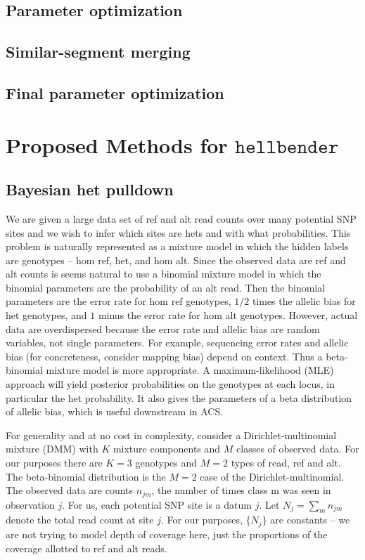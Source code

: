 \documentclass[nofootinbib,amssymb,amsmath]{revtex4}
\begin{document}
\subsection{Parameter optimization}\label{parameter-optimization}

\subsection{Similar-segment merging} \label{similar-segment-merging}

\subsection{Final parameter optimization} \label{final-parameter-optimization}

\section{Proposed Methods for $\texttt{hellbender}$} \label{proposed-methods-for-texttthellbender}

\subsection{Bayesian het pulldown} \label{bayesian-het-pulldown}

We are given a large data set of ref and alt read counts over many potential SNP sites and we wish to infer which sites are hets and with what probabilities.  This problem is naturally represented as a mixture model in which the hidden labels are genotypes -- hom ref, het, and hom alt.  Since the observed data are ref and alt counts is seems natural to use a binomial mixture model in which the binomial parameters are the probability of an alt read.  Then the binomial parameters are the error rate for hom ref genotypes, $1/2$ times the allelic bias for het genotypes, and $1$ minus the error rate for hom alt genotypes.  However, actual data are overdispersed because the error rate and allelic bias are random variables, not single parameters.  For example, sequencing error rates and allelic bias (for concreteness, consider mapping bias) depend on context.  Thus a beta-binomial mixture model is more appropriate.  A maximum-likelihood (MLE) approach will yield posterior probabilities on the genotypes at each locus, in particular the het probability.  It also gives the parameters of a beta distribution of allelic bias, which is useful downstream in ACS.

For generality and at no cost in complexity, consider a Dirichlet-multinomial mixture (DMM) with $K$ mixture components and $M$ classes of observed data.  For our purposes there are $K = 3$ genotypes and $M = 2$ types of read, ref and alt.  The beta-binomial distribution is the $M = 2$ case of the Dirichlet-multinomial.  The observed data are counts $n_{jm}$, the number of times class m was seen in observation $j$.  For us, each potential SNP site is a datum $j$.  Let $N_j = \sum_m n_{jm}$ denote the total read count at site $j$.  For our purposes, $\{ N_j \}$ are constants -- we are not trying to model depth of coverage here, just the proportions of the coverage allotted to ref and alt reads.
\end{document}
